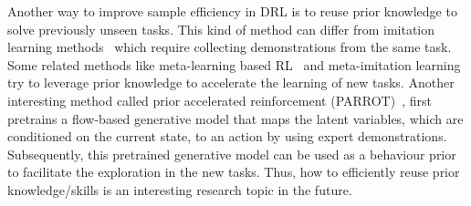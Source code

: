 Another way to improve sample efficiency in DRL is to reuse prior knowledge to solve previously unseen tasks. This kind of method can differ from imitation learning methods~\cite{bojarski2016end,xu2017end,torabi2018behavioral} which require collecting demonstrations from the same task. Some related methods like meta-learning based RL~\cite{duan2016rl,wang2017learning,finn2017model} and meta-imitation learning~\cite{duan2017one,finn2017one,huang2019continuous} try to leverage prior knowledge to accelerate the learning of new tasks. Another interesting method called prior accelerated reinforcement (PARROT)~\cite{singh2020parrot}, first pretrains a flow-based generative model that maps the latent variables, which are conditioned on the current state, to an action by using expert demonstrations. Subsequently, this pretrained generative model can be used as a behaviour prior to facilitate the exploration in the new tasks. Thus, how to efficiently reuse prior knowledge/skills is an interesting research topic in the future.

